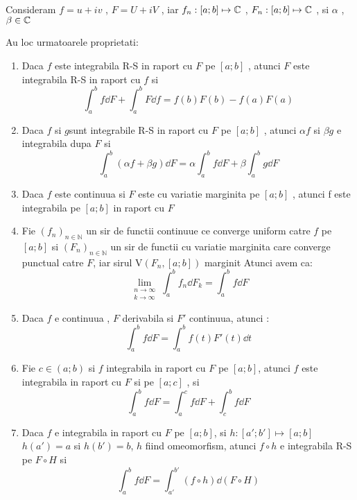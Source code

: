 \begin{theorem}
    Consideram  $f=u+iv$ ,  $F=U+iV$ , iar $f_n : [a;b] \mapsto \mathbb{C}$ , $F_n : [a;b]\mapsto \mathbb{C}$ ,
     si $\alpha$ , $\beta \in \mathbb{C}$

    Au loc urmatoarele proprietati:
    \begin{enumerate}
        \item Daca $f$ este integrabila R-S in raport cu $F$ pe $[a;b]$ , atunci $F$ este integrabila
            R-S in raport cu $f$ si
            \[
                \int_a^b f \dd F + \int_a^b F \dd f = f(b) F(b) -f(a)F(a)
            \]
        \item Daca $f$ si $g$sunt integrabile R-S in raport cu $F$ pe $[a;b]$ , atunci
            $\alpha f $ si $\beta g$ e integrabila dupa $F$ si
            \[
               \int_a^b (\alpha f + \beta g) \dd F = \alpha \int_a^b f \dd F + \beta \int_a^b g \dd F
            \]
        \item Daca $f$ este continuua si $F$ este cu variatie marginita pe $[a;b]$ , atunci f este
            integrabila pe $[a;b]$ in raport cu $F$
        \item Fie $(f_n)_{n \in \mathbb{N}}$ un sir de functii continuue ce converge uniform catre
            $f$ pe $[a;b]$ si $(F_n)_{n \in \mathbb{N}}$ un sir de functii cu variatie marginita
            care converge punctual catre $F$, iar sirul $\mathrm{V}(F_n, [a;b])$ marginit
            Atunci avem ca:
            \[
                \lim_{\substack{
                        n \to \infty \\
                        k \to \infty
                    }} \int_a^b f_n \dd F_k = \int_a^b f \dd F
            \]
        \item Daca $f$ e continuua , $F$ derivabila si $F'$ continuua, atunci :
            \[
                \int_a^b f \dd F = \int_a^b f(t) F'(t) \dd t
            \]
        \item Fie $c \in (a;b)$ si $f$ integrabila in raport cu $F$ pe $[a;b]$, atunci $f$
            este integrabila in raport cu $F$ si pe $[a;c]$ , si
            \[
                \int_a^b f \dd F = \int_a^c f \dd F + \int_c^b f \dd F
            \]
        \item Daca $f$ e integrabila in raport cu $F$ pe $[a;b]$, si $h:[a';b'] \mapsto [a;b]$
            $h(a')=a$ si $h(b')=b$, $h$ fiind omeomorfism, atunci $f \circ h$ e integrabila R-S pe
            $F \circ H$ si
            \[ \int_a^b f \dd F = \int_{a'}^{b'} (f \circ h) \dd (F \circ H)  \]
    \end{enumerate}
\end{theorem}


